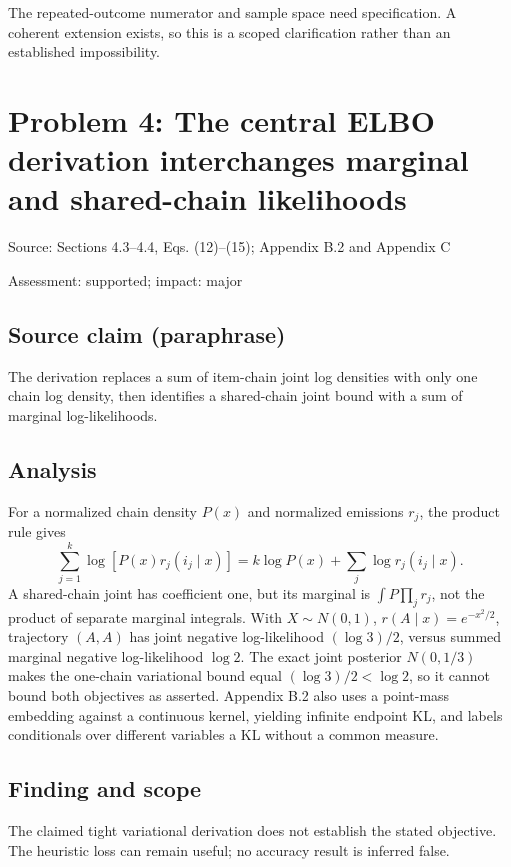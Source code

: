 \documentclass[11pt]{article}
\begin{document}
The repeated-outcome numerator and sample space need specification. A coherent extension exists, so this is a scoped clarification rather than an established impossibility.

\section*{Problem 4: The central ELBO derivation interchanges marginal and shared-chain likelihoods}

Source: Sections 4.3–4.4, Eqs. (12)–(15); Appendix B.2 and Appendix C

Assessment: supported; impact: major

\subsection*{Source claim (paraphrase)}

The derivation replaces a sum of item-chain joint log densities with only one chain log density, then identifies a shared-chain joint bound with a sum of marginal log-likelihoods.

\subsection*{Analysis}

For a normalized chain density \(P(x)\) and normalized emissions \(r_j\), the product rule gives \[\sum_{j=1}^k\log[P(x)r_j(i_j\mid x)]=k\log P(x)+\sum_j\log r_j(i_j\mid x).\] A shared-chain joint has coefficient one, but its marginal is \(\int P\prod_jr_j\), not the product of separate marginal integrals. With \(X\sim N(0,1)\), \(r(A\mid x)=e^{-x^2/2}\), trajectory \((A,A)\) has joint negative log-likelihood \((\log3)/2\), versus summed marginal negative log-likelihood \(\log2\). The exact joint posterior \(N(0,1/3)\) makes the one-chain variational bound equal \((\log3)/2<\log2\), so it cannot bound both objectives as asserted. Appendix B.2 also uses a point-mass embedding against a continuous kernel, yielding infinite endpoint KL, and labels conditionals over different variables a KL without a common measure.

\subsection*{Finding and scope}

The claimed tight variational derivation does not establish the stated objective. The heuristic loss can remain useful; no accuracy result is inferred false.
\end{document}
